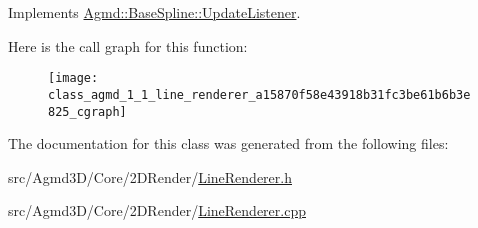 Implements \hyperlink{class_agmd_1_1_base_spline_1_1_update_listener_a29021f2b978986762860c17b9ee590d1}{Agmd\+::\+Base\+Spline\+::\+Update\+Listener}.



Here is the call graph for this function\+:\nopagebreak
\begin{figure}[H]
\begin{center}
\leavevmode
\texttt{[image: class\_agmd\_1\_1\_line\_renderer\_a15870f58e43918b31fc3be61b6b3e825\_cgraph]}
\end{center}
\end{figure}




The documentation for this class was generated from the following files\+:\begin{DoxyCompactItemize}
\item 
src/\+Agmd3\+D/\+Core/2\+D\+Render/\hyperlink{_line_renderer_8h}{Line\+Renderer.\+h}\item 
src/\+Agmd3\+D/\+Core/2\+D\+Render/\hyperlink{_line_renderer_8cpp}{Line\+Renderer.\+cpp}\end{DoxyCompactItemize}

